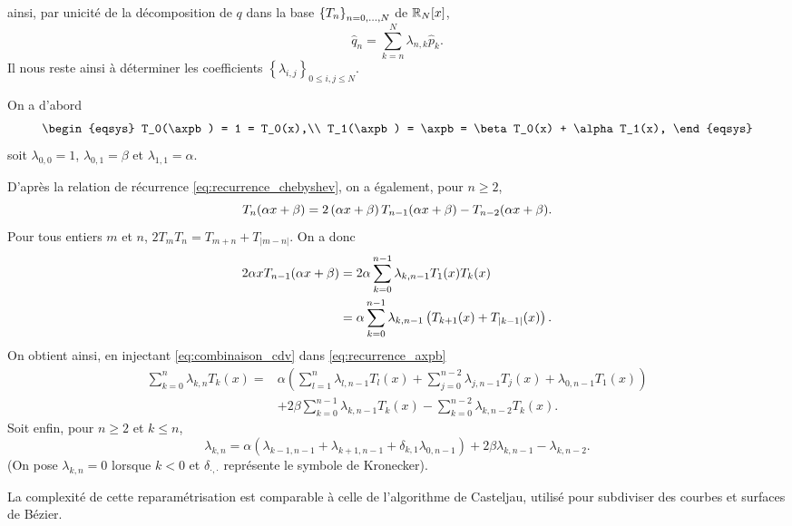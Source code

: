 ainsi, par unicité de la décomposition de $q$ dans la base $\left\{{T}_{n}\right\}_{{n}={0},\ldots,{N}}$ de $\mathbb{R}_{N}[x]$,
\begin{equation}
	\hat{q}_n = \sum_{k=n}^{N} \lambda_{n,k} \hat{p}_k.
\end{equation}
%
Il nous reste ainsi à déterminer les coefficients $\left\{ \lambda_{i,j} \right\}_{0 \leq i,j \leq N}$.
\par\bigskip
On a d'abord
\begin{equation*}
	\begin{eqsys}
		T_0(\axpb) = 1 = T_0(x),\\
		T_1(\axpb) = \axpb = \beta T_0(x) + \alpha T_1(x),
	\end{eqsys}
\end{equation*}
soit $\lambda_{0,0} = 1$, $\lambda_{0,1} = \beta$ et $\lambda_{1,1} = \alpha$.
\par
D'après la relation de récurrence \eqref{eq:recurrence_chebyshev}, on a également, pour $n \geq 2$,
\begin{equation}
	T_n(\alpha x + \beta) =
	2 \left(\alpha x + \beta\right) T_{n-1}(\alpha x + \beta) 
	- T_{n-2}(\alpha x + \beta).
	\label{eq:recurrence_axpb}
\end{equation}
%
Pour tous entiers $m$ et $n$, $2 T_m T_n = T_{m+n} + T_{\left|m - n\right|}$. On a donc%
\begin{align*}
	2 \alpha x T_{n-1}(\alpha x + \beta) &=
	2 \alpha \sum_{k=0}^{n-1} \lambda_{k,n-1} T_1(x) T_k(x) \\
	&= \alpha \sum_{k=0}^{n-1} \lambda_{k,n-1} \left(T_{k+1}(x) + T_{\left|k-1\right|}(x)\right).
\end{align*}
%
On obtient ainsi, en injectant \eqref{eq:combinaison_cdv} dans \eqref{eq:recurrence_axpb}
\begin{align*}
	\sum_{k=0}^{n} \lambda_{k,n} T_k(x) = 
	&\alpha \left(
	\sum_{l=1}^{n} \lambda_{l,n-1} T_l(x) +
	\sum_{j=0}^{n-2} \lambda_{j,n-1} T_j(x) +
	\lambda_{0,n-1} T_1(x)
	\right) \\
	&+ 2 \beta \sum_{k=0}^{n-1} \lambda_{k,n-1} T_k(x)
	- \sum_{k=0}^{n-2} \lambda_{k,n-2} T_k(x).
\end{align*}
%
Soit enfin, pour $n \geq 2$ et $k \leq n$,
\begin{equation}
	\lambda_{k,n} = 
	\alpha \left(
	\lambda_{k-1,n-1} + \lambda_{k+1,n-1} + \delta_{k,1} \lambda_{0,n-1}
	\right)
	+ 2 \beta \lambda_{k,n-1} - \lambda_{k,n-2}.
\end{equation}
(On pose $\lambda_{k,n} = 0$ lorsque $k < 0$ et $\delta_{\cdot,\cdot}$ représente le symbole de Kronecker).\par
%
La complexité de cette reparamétrisation est comparable à celle de l'algorithme de Casteljau, utilisé pour subdiviser des courbes et surfaces de Bézier.